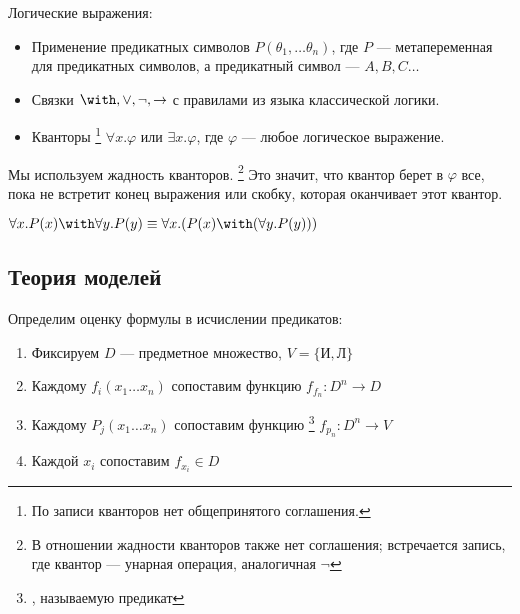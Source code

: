 \documentclass[12pt, a4paper, oneside]{book}
\begin{document}
Логические выражения:
\begin{itemize}
    \item Применение предикатных символов \(P(\theta_1, \dots \theta_n)\), где \(P\) --- метапеременная для предикатных символов, а предикатный символ --- \(A, B, C \dots \)
    \item Связки \(\with, \lor, \neg, \to \) с правилами из языка классической логики.
    \item Кванторы \footnote{По записи кванторов нет общепринятого соглашения.} \(\forall x.\varphi\) или \(\exists x.\varphi\), где \(\varphi\) --- любое логическое выражение.
\end{itemize}

Мы используем жадность кванторов. \footnote{В отношении жадности кванторов также нет соглашения; встречается запись, где квантор --- унарная операция, аналогичная \(\neg\)} Это значит, что квантор берет в \(\varphi\) все, пока не встретит конец выражения или скобку, которая оканчивает этот квантор.

\begin{example}
    \(\forall x.P(x) \with \forall y.P(y) \equiv \forall x.(P(x) \with (\forall y.P(y)))\)
\end{example}

\subsection{Теория моделей}

Определим оценку формулы в исчислении предикатов:

\begin{enumerate}
    \item Фиксируем \(D\) --- предметное множество, \(V = \{\text{И}, \text{Л}\} \)
    \item Каждому \(f_i(x_1 \dots x_n)\) сопоставим функцию \(f_{f_n} : D^n \to D\)
    \item Каждому \(P_j(x_1 \dots x_n)\) сопоставим функцию \footnote{,  называемую предикат} \(f_{p_n} : D^n \to V\)
    \item Каждой \(x_i\) сопоставим \(f_{x_i}\in D\)
\end{enumerate}
\end{document}
